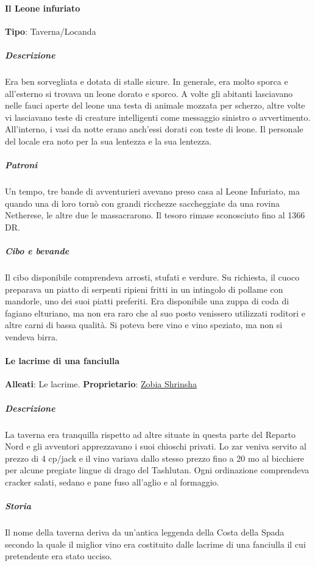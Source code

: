 \documentclass{article}
\begin{document}
                  \paragraph{Il Leone infuriato}
                  \textbf{Tipo}: Taverna/Locanda
                      \subparagraph{Descrizione}
                      Era ben sorvegliata e dotata di stalle sicure. In generale, era molto sporca e all'esterno si trovava un leone dorato e sporco. A volte gli abitanti lasciavano nelle fauci aperte del leone una testa di animale mozzata per scherzo, altre volte vi lasciavano teste di creature intelligenti come messaggio sinistro o avvertimento. All'interno, i vasi da notte erano anch'essi dorati con teste di leone. Il personale del locale era noto per la sua lentezza e la sua lentezza.

                      \subparagraph{Patroni}
                      Un tempo, tre bande di avventurieri avevano preso casa al Leone Infuriato, ma quando una di loro tornò con grandi ricchezze saccheggiate da una rovina Netherese, le altre due le massacrarono. Il tesoro rimase sconosciuto fino al 1366 DR.

                      \subparagraph{Cibo e bevande}
                      Il cibo disponibile comprendeva arrosti, stufati e verdure. Su richiesta, il cuoco preparava un piatto di serpenti ripieni fritti in un intingolo di pollame con mandorle, uno dei suoi piatti preferiti. Era disponibile una zuppa di coda di fagiano elturiano, ma non era raro che al suo posto venissero utilizzati roditori e altre carni di bassa qualità. Si poteva bere vino e vino speziato, ma non si vendeva birra.
                  \paragraph{Le lacrime di una fanciulla}
                  \textbf{Alleati}: Le lacrime.
                                    \textbf{Proprietario}: \href{https://forgottenrealms.fandom.com/wiki/Zobia_Shrinsha}{Zobia Shrinsha}
                      \subparagraph{Descrizione}
                      La taverna era tranquilla rispetto ad altre situate in questa parte del Reparto Nord e gli avventori apprezzavano i suoi chioschi privati. Lo zar veniva servito al prezzo di 4 cp/jack e il vino variava dallo stesso prezzo fino a 20  mo al bicchiere per alcune pregiate lingue di drago del Tashlutan. Ogni ordinazione comprendeva cracker salati, sedano e pane fuso all'aglio e al formaggio.

                      \subparagraph{Storia}
                      Il nome della taverna deriva da un'antica leggenda della Costa della Spada secondo la quale il miglior vino era costituito dalle lacrime di una fanciulla il cui pretendente era stato ucciso.
\end{document}

